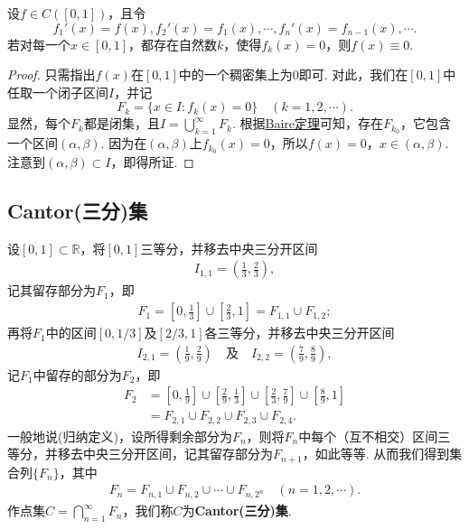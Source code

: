 \documentclass[../../main.tex]{subfiles}
\begin{document}
\begin{example}\label{example:例16}
设$f\in C([0,1])$，且令
\[
f_1'(x)=f(x), f_2'(x)=f_1(x), \cdots, f_n'(x)=f_{n - 1}(x), \cdots.
\]
若对每一个$x\in[0,1]$，都存在自然数$k$，使得$f_k(x)=0$，则$f(x)\equiv0$.
\end{example}
\begin{proof}
只需指出$f(x)$在$[0,1]$中的一个稠密集上为$0$即可. 对此，我们在$[0,1]$中任取一个闭子区间$I$，并记
\[
F_k=\{x\in I: f_k(x)=0\} \quad (k = 1,2,\cdots).
\]
显然，每个$F_k$都是闭集，且$I=\bigcup_{k = 1}^{\infty}F_k$. 根据\hyperref[theorem:Baire定理]{Baire定理}可知，存在$F_{k_0}$，它包含一个区间$(\alpha,\beta)$. 因为在$(\alpha,\beta)$上$f_{k_0}(x)=0$，所以$f(x)=0$，$x\in(\alpha,\beta)$. 注意到$(\alpha,\beta)\subset I$，即得所证. 

\end{proof}



\subsection{Cantor(三分)集}

\begin{definition}
设$[0,1]\subset\mathbb{R}$，将$[0,1]$三等分，并移去中央三分开区间
\begin{align*}
I_{1,1}=\left(\frac{1}{3},\frac{2}{3}\right),
\end{align*}
记其留存部分为$F_1$，即
\begin{align*}
F_1=\left[0,\frac{1}{3}\right]\cup\left[\frac{2}{3},1\right]=F_{1,1}\cup F_{1,2};
\end{align*}
再将$F_1$中的区间$[0,1/3]$及$[2/3,1]$各三等分，并移去中央三分开区间
\begin{align*}
I_{2,1}=\left(\frac{1}{9},\frac{2}{9}\right) \quad \text{及} \quad I_{2,2}=\left(\frac{7}{9},\frac{8}{9}\right),
\end{align*}
记$F_1$中留存的部分为$F_2$，即
\begin{align*}
F_2&=\left[0,\frac{1}{9}\right]\cup\left[\frac{2}{9},\frac{1}{3}\right]\cup\left[\frac{2}{3},\frac{7}{9}\right]\cup\left[\frac{8}{9},1\right]\\
&=F_{2,1}\cup F_{2,2}\cup F_{2,3}\cup F_{2,4}.
\end{align*}
一般地说(归纳定义)，设所得剩余部分为$F_n$，则将$F_n$中每个（互不相交）区间三等分，并移去中央三分开区间，记其留存部分为$F_{n + 1}$，如此等等. 从而我们得到集合列$\{F_n\}$，其中
\begin{align*}
F_n=F_{n,1}\cup F_{n,2}\cup\cdots\cup F_{n,2^n} \quad (n = 1,2,\cdots).
\end{align*}
作点集$C = \bigcap_{n = 1}^{\infty}F_n$，我们称$C$为\textbf{Cantor(三分)集}. 
\end{definition}
\end{document}
